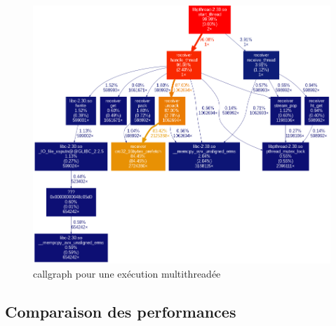 \documentclass[../main.tex]{subfiles}
\begin{document}
\newpage
\begin{figure}
    \includegraphics[scale=1.2]{assets/callgraph.png}
    \caption{callgraph pour une exécution multithreadée}
\end{figure}

\subsection{Comparaison des performances}
\label{sec:perf_plot}
\end{document}
